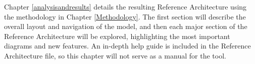 
Chapter \ref{analysisandresults} details the resulting Reference Architecture using the methodology in Chapter \ref{Methodology}. The first section will describe the overall layout and navigation of the model, and then each major section of the Reference Architecture will be explored, highlighting the most important diagrams and new features. An in-depth help guide is included in the Reference Architecture file, so this chapter will not serve as a manual for the tool.  